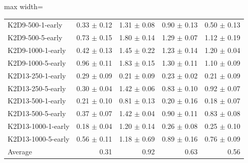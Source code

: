 \documentclass{article}
\begin{document}
\begin{table}[ht]
\begin{center}
\begin{small}
\begin{adjustbox}{max width=\columnwidth}
\begin{tabular}{l|rrrr}
K2D9-500-1-early & 0.33 $\pm$ 0.12 & 1.31 $\pm$ 0.08 & 0.90 $\pm$ 0.13 & 0.50 $\pm$ 0.13\\
K2D9-500-5-early & 0.73 $\pm$ 0.15 & 1.80 $\pm$ 0.14 & 1.29 $\pm$ 0.07 & 1.12 $\pm$ 0.19\\
K2D9-1000-1-early & 0.42 $\pm$ 0.13 & 1.45 $\pm$ 0.22 & 1.23 $\pm$ 0.14 & 1.20 $\pm$ 0.04\\
K2D9-1000-5-early & 0.96 $\pm$ 0.11 & 1.83 $\pm$ 0.15 & 1.30 $\pm$ 0.11 & 1.10 $\pm$ 0.09\\
K2D13-250-1-early & 0.29 $\pm$ 0.09 & 0.21 $\pm$ 0.09 & 0.23 $\pm$ 0.02 & 0.21 $\pm$ 0.09\\
K2D13-250-5-early & 0.30 $\pm$ 0.04 & 1.42 $\pm$ 0.06 & 0.83 $\pm$ 0.10 & 0.92 $\pm$ 0.07\\
K2D13-500-1-early & 0.21 $\pm$ 0.10 & 0.81 $\pm$ 0.13 & 0.20 $\pm$ 0.16 & 0.18 $\pm$ 0.07\\
K2D13-500-5-early & 0.37 $\pm$ 0.07 & 1.42 $\pm$ 0.04 & 0.90 $\pm$ 0.11 & 0.83 $\pm$ 0.08\\
K2D13-1000-1-early & 0.18 $\pm$ 0.04 & 1.20 $\pm$ 0.14 & 0.26 $\pm$ 0.08 & 0.25 $\pm$ 0.10\\
K2D13-1000-5-early & 0.56 $\pm$ 0.11 & 1.18 $\pm$ 0.69 & 0.89 $\pm$ 0.16 & 0.76 $\pm$ 0.09\\
\midrule
Average & 0.31 & 0.92 & 0.63 & 0.56\\
\end{tabular}
        \end{adjustbox}
    \end{small}
    \end{center}
    \vskip -0.1in
\end{table}
\end{document}
